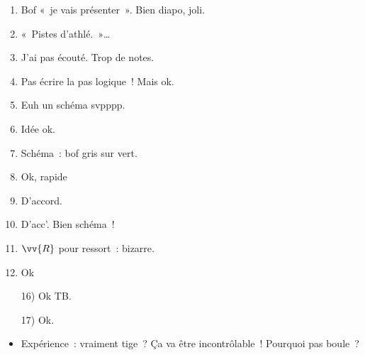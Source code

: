 \documentclass[a4paper, 11pt, final, garamond]{book}
\begin{document}
\begin{enumerate}[start=0]
  \item Bof «~je vais présenter~». Bien diapo, joli.
  \item «~Pistes d'athlé.~»…
  \item J'ai pas écouté. Trop de notes.
  \item Pas écrire la pas logique~! Mais ok.
  \item Euh un schéma svpppp.
  \item Idée ok.
  \item Schéma~: bof gris sur vert.
  \item Ok, rapide
  \item D'accord.
  \item D'acc'. Bien schéma~!
  \item $\vv{R}$ pour ressort~: bizarre.
  \item Ok
  \item[16)] Ok TB.
  \item[17)] Ok.
\end{enumerate}

\begin{itemize}
  \item Expérience~: vraiment tige~? Ça va être incontrôlable~! Pourquoi pas
    boule~?
\end{itemize}
\end{document}
